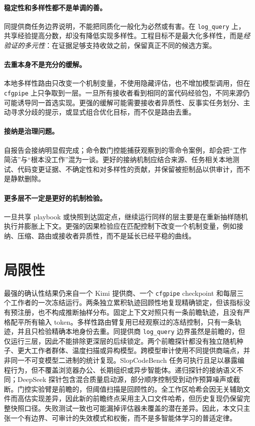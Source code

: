 \documentclass[UTF8,letterpaper,10pt,twocolumn]{ctexart}
\begin{document}
\paragraph{稳定性和多样性都不是单调的善。}
同提供商任务边界说明，不能把同质化一般化为必然或有害。在 \texttt{log\_query} 上，共享经验提高分数，却没有降低实现多样性。工程目标不是最大化多样性，而是\emph{经验证的多元性}：在证据足够支持收敛之前，保留真正不同的候选方案。

\paragraph{去重本身不是充分的缓解。}
本地多样性路由只改变一个机制变量，不使用隐藏评估，也不增加模型调用，但在 \texttt{cfgpipe} 上只争取到一层。一旦所有接收者看到相同的富代码经验包，不同来源仍可能诱导同一首选实现。更强的缓解可能需要接收者异质性、反事实任务划分、主动寻求分歧的提示，或显式组合优化目标，而不仅是路由去重。

\paragraph{接纳是治理问题。}
自报告会接纳明显假完成；命令数门控能捕获观察到的零命令案例，却会把“工作简洁”与“根本没工作”混为一谈。更好的接纳机制应结合来源、任务相关本地测试、代码变更证据、不确定性和对多样性的贡献，并保留被拒制品以供审计，而不是静默删除。

\paragraph{更多层不一定是更好的机制检验。}
一旦共享 playbook 或快照到达固定点，继续运行同样的层主要是在重新抽样随机执行并膨胀上下文。更强的因果检验应在匹配控制下改变一个机制变量，例如接纳、压缩、路由或接收者异质性，而不是延长已经平稳的曲线。

\section{局限性}

最强的确认性结果仍来自一个 Kimi 提供商、一个 \texttt{cfgpipe} checkpoint 和每层三个工作者的一次冻结运行。两条独立累积轨迹回顾性地复现精确锁定，但该指标没有预注册，也不构成推断抽样分布。固定上下文对照只有一条前瞻轨迹，且没有严格配平所有输入 token。多样性路由臂复用已经观察过的冻结控制，只有一条轨迹，并且只检验精确本地身份去重。同提供商 \texttt{log\_query} 边界虽然是前瞻的，但仅运行三层，因此不能排除更深层的后续锁定。两个前瞻探针都没有独立随机种子、更大工作者群体、温度扫描或异构模型。跨模型审计使用不同提供商端点，并非同一不可变模型二进制的统计复现。SlopCodeBench 任务可执行且足以暴露编程行为，但不覆盖浏览器办公、长期组织或异步智能体。递归探针的接纳语义不同；DeepSeek 探针包含混合质量启动源，部分顺序控制受到动作预算噪声或截断。门控实验臂是前瞻的，但阈值扫描是回顾性的。全工作区哈希会因无关辅助文件而高估实现差异，因此新的前瞻终点采用主入口文件哈希，但历史复现仍保留完整快照口径。失败测试一致也可能漏掉评估器未覆盖的潜在差异。因此，本文只主张一个有边界、可审计的失效模式和权衡，而不是多智能体学习的普适定律。
\end{document}

